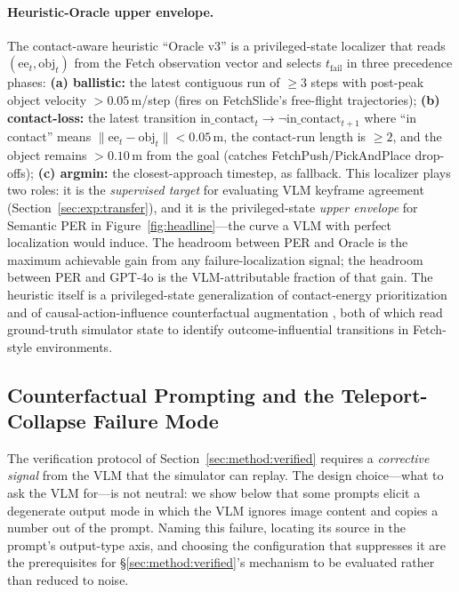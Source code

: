 \documentclass{article}
\begin{document}
\paragraph{Heuristic-Oracle upper envelope.}
The contact-aware heuristic ``Oracle v3'' is a privileged-state localizer
that reads $(\text{ee}_t,\text{obj}_t)$ from the Fetch observation vector
and selects $t_{\text{fail}}$ in three precedence phases:
\textbf{(a) ballistic:} the latest contiguous run of $\ge 3$ steps with
post-peak object velocity $>0.05$\,m/step (fires on FetchSlide's free-flight
trajectories);
\textbf{(b) contact-loss:} the latest transition
$\text{in\_contact}_t\!\to\!\neg\text{in\_contact}_{t+1}$ where
``in contact'' means $\|\text{ee}_t\!-\!\text{obj}_t\|\!<\!0.05$\,m,
the contact-run length is $\ge 2$, and the object remains
$>0.10$\,m from the goal (catches FetchPush/PickAndPlace drop-offs);
\textbf{(c) argmin:} the closest-approach timestep, as fallback.
This localizer plays two roles: it is the \emph{supervised target} for
evaluating VLM keyframe agreement (Section~\ref{sec:exp:transfer}), and it
is the privileged-state \emph{upper envelope} for Semantic PER in
Figure~\ref{fig:headline}---the curve a VLM with perfect localization
would induce. The headroom between PER and Oracle is the maximum
achievable gain from any failure-localization signal; the headroom
between PER and GPT-4o is the VLM-attributable fraction of that gain.
The heuristic itself is a privileged-state generalization of contact-energy
prioritization \citep{sayar2023cebp} and of causal-action-influence
counterfactual augmentation \citep{urpi2024caiac}, both of which read
ground-truth simulator state to identify outcome-influential transitions
in Fetch-style environments.

\subsection{Counterfactual Prompting and the Teleport-Collapse Failure Mode}
\label{sec:method:prompt}

The verification protocol of Section~\ref{sec:method:verified} requires a
\emph{corrective signal} from the VLM that the simulator can replay. The
design choice---what to ask the VLM for---is not neutral: we show below that
some prompts elicit a degenerate output mode in which the VLM ignores image
content and copies a number out of the prompt. Naming this failure, locating
its source in the prompt's output-type axis, and choosing the configuration
that suppresses it are the prerequisites for §\ref{sec:method:verified}'s
mechanism to be evaluated rather than reduced to noise.
\end{document}
